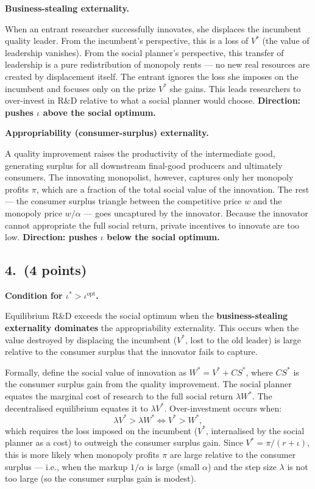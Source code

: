 \documentclass[a4paper,11pt]{article}
\begin{document}
\begin{answerbox}
\textbf{Business-stealing externality.}

When an entrant researcher successfully innovates, she displaces the incumbent quality
leader. From the incumbent's perspective, this is a loss of $V^*$ (the value of
leadership vanishes). From the social planner's perspective, this transfer of leadership
is a pure redistribution of monopoly rents --- no new real resources are created by
displacement itself. The entrant ignores the loss she imposes on the incumbent and
focuses only on the prize $V^*$ she gains. This leads researchers to over-invest in R\&D
relative to what a social planner would choose. \textbf{Direction: pushes $\iota$ above
the social optimum.}

\textbf{Appropriability (consumer-surplus) externality.}

A quality improvement raises the productivity of the intermediate good, generating
surplus for all downstream final-good producers and ultimately consumers. The
innovating monopolist, however, captures only her monopoly profits $\pi$, which are a
fraction of the total social value of the innovation. The rest --- the consumer surplus
triangle between the competitive price $w$ and the monopoly price $w/\alpha$ ---
goes uncaptured by the innovator. Because the innovator cannot appropriate the full
social return, private incentives to innovate are too low. \textbf{Direction: pushes
$\iota$ below the social optimum.}
\end{answerbox}

\subsection*{4.\ (4 points)}

\begin{answerbox}
\textbf{Condition for $\iota^* > \iota^{\text{opt}}$.}

Equilibrium R\&D exceeds the social optimum when the \textbf{business-stealing
externality dominates} the appropriability externality. This occurs when the value
destroyed by displacing the incumbent ($V^*$, lost to the old leader) is large relative
to the consumer surplus that the innovator fails to capture.

Formally, define the social value of innovation as $W^* = V^* + CS^*$, where $CS^*$ is
the consumer surplus gain from the quality improvement. The social planner equates the
marginal cost of research to the full social return $\lambda W^*$. The decentralised
equilibrium equates it to $\lambda V^*$. Over-investment occurs when:
\[
    \lambda V^* > \lambda W^* \iff V^* > W^*,
\]
which requires the loss imposed on the incumbent ($V^*$, internalised by the social
planner as a cost) to outweigh the consumer surplus gain. Since $V^* = \pi/(r+\iota)$,
this is more likely when monopoly profits $\pi$ are large relative to the consumer
surplus --- i.e., when the markup $1/\alpha$ is large (small $\alpha$) and the step size
$\lambda$ is not too large (so the consumer surplus gain is modest).
\end{answerbox}
\end{document}
